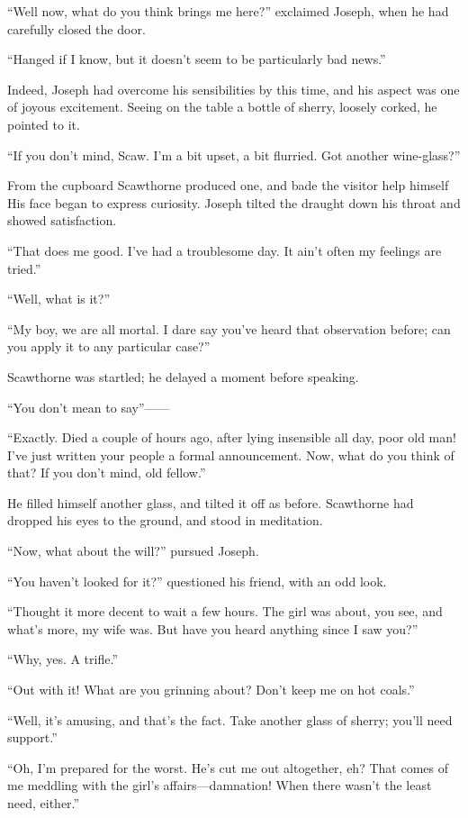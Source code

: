 ``Well now, what do you think brings me here?'' exclaimed Joseph, when
he had carefully closed the door.

``Hanged if I know, but it doesn't seem to be particularly bad news.''

Indeed, Joseph had overcome his sensibilities by this time, and his
aspect was one of joyous excitement. Seeing on the table a bottle of
sherry, loosely corked, he pointed to it.

``If you don't mind, Scaw. I'm a bit upset, a bit flurried. Got another
wine-glass?''

From the cupboard Scawthorne produced one, and bade the visitor help
himself His face began to express curiosity. Joseph tilted the draught
down his throat and showed satisfaction.

``That does me good. I've had a troublesome day. It ain't often my
feelings are tried.''

{}``Well, what is it?''

``My boy, we are all mortal. I dare say you've heard that observation
before; can you apply it to any particular case?''

Scawthorne was startled; he delayed a moment before speaking.

``You don't mean to say''{{------}}

``Exactly. Died a couple of hours ago, after lying insensible all day,
poor old man! I've just written your people a formal announcement. Now,
what do you think of that? If you don't mind, old fellow.''

He filled himself another glass, and tilted it off as before. Scawthorne
had dropped his eyes to the ground, and stood in meditation.

``Now, what about the will?'' pursued Joseph.

``You haven't looked for it?'' questioned his friend, with an odd look.

``Thought it more decent to wait a few hours. The girl was about, you
see, and what's more, my wife was. But have you heard anything since I
saw you?''

``Why, yes. A trifle.''

``Out with it! What are you grinning about? Don't keep me on hot
coals.''

``Well, it's amusing, and that's the fact. {}Take another glass of
sherry; you'll need support.''

``Oh, I'm prepared for the worst. He's cut me out altogether, eh? That
comes of me meddling with the girl's affairs---damnation! When there
wasn't the least need, either.''

